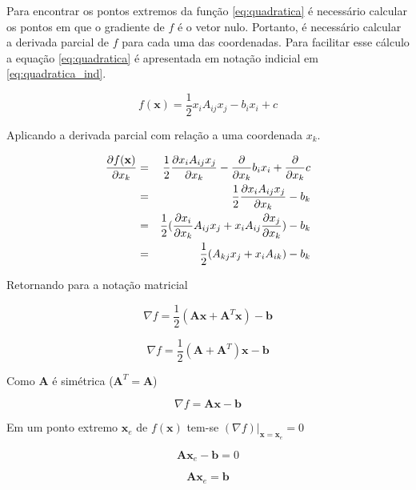 Para encontrar os pontos extremos da função \eqref{eq:quadratica} é necessário calcular os pontos em que o gradiente de $f$ é o vetor nulo. Portanto, é necessário calcular a derivada parcial de $f$ para cada uma das coordenadas. Para facilitar esse cálculo a equação \eqref{eq:quadratica} é apresentada em notação indicial em \eqref{eq:quadratica_ind}.


\begin{equation} \label{eq:quadratica_ind}
    f(\mathbf{x}) = \frac{1}{2} x_i A_{ij} x_j - b_i x_i + c
\end{equation}


Aplicando a derivada parcial com relação a uma coordenada $x_k$.


\begin{eqnarray}
     \dxk[f(\mathbf{x})] & = & \frac{1}{2} \dxk[ x_i A_{ij} x_j ]- \dxk{b_i x_i}+ \dxk{c} \\
                & = & \frac{1}{2} \dxk[ x_i A_{ij} x_j ]- b_k \\
                & = & \frac{1}{2} (\dxk[ x_i ]A_{ij} x_j  + x_i A_{ij} \dxk[x_j]) - b_k \\
                & = & \frac{1}{2}(A_{kj} x_j  + x_i A_{ik})  - b_k
\end{eqnarray}


Retornando para a notação matricial


\begin{equation}
    \nabla f = \frac{1}{2} (\mathbf{A}\mathbf{x} + \mathbf{A}^T \mathbf{x}) - \mathbf{b}
\end{equation}


\begin{equation}
    \nabla f = \frac{1}{2} (\mathbf{A} + \mathbf{A}^T) \mathbf{x} - \mathbf{b}
\end{equation}

Como $\mathbf{A}$ é simétrica ($\mathbf{A}^T = \mathbf{A}$)

\begin{equation} \label{eq:gradf}
    \nabla f = \mathbf{A} \mathbf{x} - \mathbf{b}
\end{equation}

Em um ponto extremo  $ \mathbf{x}_e$ de $f(\mathbf{x})$ tem-se $(\nabla f)|_{\mathbf{x}=\mathbf{x}_e} = 0 $

\begin{equation}
    \mathbf{A}\mathbf{x}_e - \mathbf{b} = 0
\end{equation}

\begin{equation}
    \mathbf{A}\mathbf{x}_e = \mathbf{b}
\end{equation}

